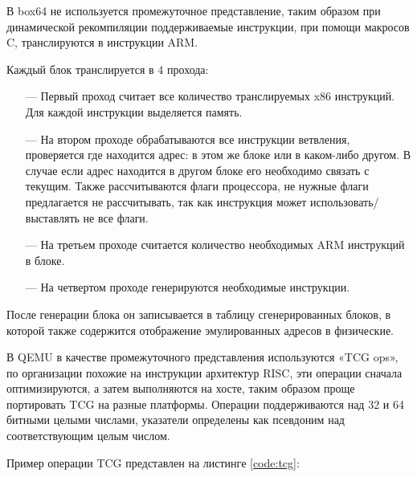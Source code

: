 В box64 не используется промежуточное представление, таким образом при динамической рекомпиляции поддерживаемые инструкции, при помощи макросов C, транслируются в инструкции ARM. \cite{box64_letter}

Каждый блок транслируется в 4 прохода:
\begin{itemize}[leftmargin=1.6\parindent]
	\item[---] Первый проход считает все количество транслируемых x86 инструкций. Для каждой инструкции выделяется память.
	\item[---] На втором проходе обрабатываются все инструкции ветвления, проверяется где находится адрес: в этом же блоке или в каком-либо другом. В случае если адрес находится в другом блоке его необходимо связать с текущим. Также рассчитываются флаги процессора, не нужные флаги предлагается не рассчитывать, так как инструкция может использовать/выставлять не все флаги.
	\item[---] На третьем проходе считается количество необходимых ARM инструкций в блоке.
	\item[---] На четвертом проходе генерируются необходимые инструкции.
\end{itemize}

После генерации блока он записывается в таблицу сгенерированных блоков, в которой также содержится отображение эмулированных адресов в физические. \cite{box64_wide}

В QEMU в качестве промежуточного представления используются «TCG ops», по организации похожие на инструкции архитектур RISC, эти операции сначала оптимизируются, а затем выполняются на хосте, таким образом проще портировать TCG на разные платформы. Операции поддерживаются над 32 и 64 битными целыми числами, указатели определены как псевдоним над соответствующим целым числом. \cite{qemu_readme}

Пример операции TCG представлен на листинге \ref{code:tcg}:
\begin{Verbatim}

\end{Verbatim}

